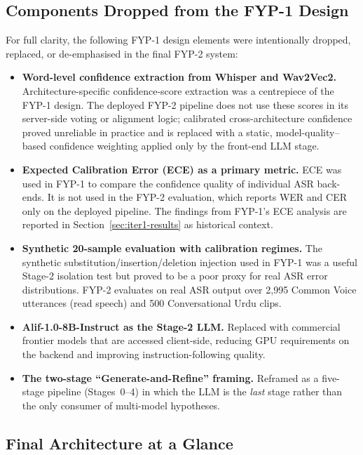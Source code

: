 \subsection{Components Dropped from the FYP-1 Design}
\label{ssec:dropped-components}

For full clarity, the following FYP-1 design elements were intentionally dropped, replaced, or de-emphasised in the final FYP-2 system:

\begin{itemize}
  \item \textbf{Word-level confidence extraction from Whisper and Wav2Vec2.} Architecture-specific confidence-score extraction was a centrepiece of the FYP-1 design. The deployed FYP-2 pipeline does not use these scores in its server-side voting or alignment logic; calibrated cross-architecture confidence proved unreliable in practice and is replaced with a static, model-quality--based confidence weighting applied only by the front-end LLM stage.
  \item \textbf{Expected Calibration Error (ECE) as a primary metric.} ECE was used in FYP-1 to compare the confidence quality of individual ASR back-ends. It is not used in the FYP-2 evaluation, which reports WER and CER only on the deployed pipeline. The findings from FYP-1's ECE analysis are reported in Section~\ref{sec:iter1-results} as historical context.
  \item \textbf{Synthetic 20-sample evaluation with calibration regimes.} The synthetic substitution/insertion/deletion injection used in FYP-1 was a useful Stage-2 isolation test but proved to be a poor proxy for real ASR error distributions. FYP-2 evaluates on real ASR output over 2{,}995 Common Voice utterances (read speech) and 500 Conversational Urdu clips.
  \item \textbf{Alif-1.0-8B-Instruct as the Stage-2 LLM.} Replaced with commercial frontier models that are accessed client-side, reducing GPU requirements on the backend and improving instruction-following quality.
  \item \textbf{The two-stage ``Generate-and-Refine'' framing.} Reframed as a five-stage pipeline (Stages~0--4) in which the LLM is the \emph{last} stage rather than the only consumer of multi-model hypotheses.
\end{itemize}

\subsection{Final Architecture at a Glance}
\label{ssec:final-arch-glance}

